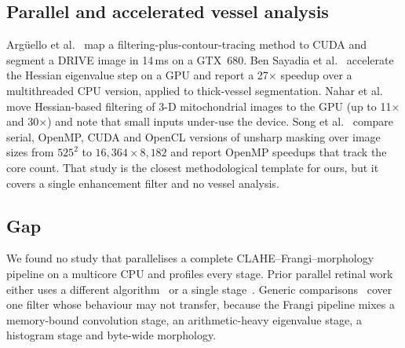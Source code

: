 \subsection{Parallel and accelerated vessel analysis}
Arg\"uello et al.~\cite{arguello2018} map a filtering-plus-contour-tracing method to CUDA and segment a DRIVE
image in 14\,ms on a GTX~680. Ben Sayadia et al.~\cite{bensayadia2020} accelerate the Hessian eigenvalue step
on a GPU and report a 27$\times$ speedup over a multithreaded CPU version, applied to thick-vessel segmentation.
Nahar et al.~\cite{nahar2026} move Hessian-based filtering of 3-D mitochondrial images to the GPU (up to
11$\times$ and 30$\times$) and note that small inputs under-use the device. Song et al.~\cite{song2022} compare
serial, OpenMP, CUDA and OpenCL versions of unsharp masking over image sizes from $525^2$ to
$16{,}364\times8{,}182$ and report OpenMP speedups that track the core count. That study is the closest
methodological template for ours, but it covers a single enhancement filter and no vessel analysis.

\subsection{Gap}
We found no study that parallelises a complete CLAHE--Frangi--morphology pipeline on a multicore CPU and
profiles every stage. Prior parallel retinal work either uses a different algorithm~\cite{arguello2018} or a
single stage~\cite{bensayadia2020}. Generic comparisons~\cite{song2022} cover one filter whose behaviour may not
transfer, because the Frangi pipeline mixes a memory-bound convolution stage, an arithmetic-heavy eigenvalue
stage, a histogram stage and byte-wide morphology.
